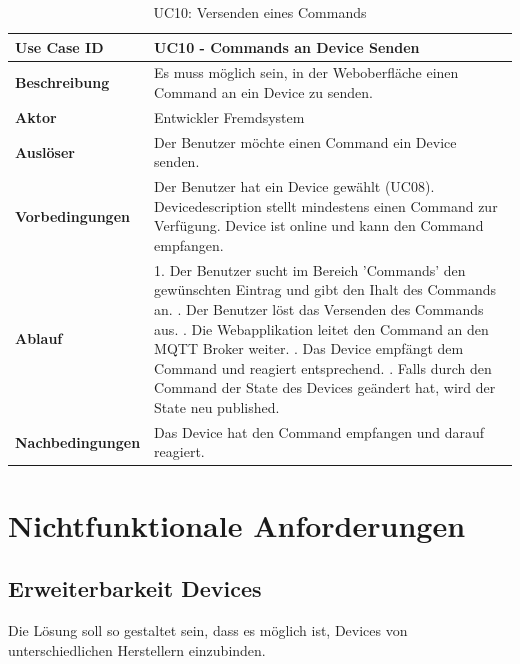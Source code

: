 \begin{table}[H]
\begin{tabularx}{\textwidth}{|l|X|}

 \hline
 {\bf Use Case ID }    & UC10 - Commands an Device Senden \\  \hline
 {\bf Beschreibung }   & Es muss möglich sein, in der Weboberfläche einen Command an ein Device zu senden. \\ \hline
 {\bf Aktor }          & Entwickler Fremdsystem \\ \hline
 {\bf Auslöser }       & Der Benutzer möchte einen Command ein Device senden. \\ \hline
 {\bf Vorbedingungen } & 
     Der Benutzer hat ein Device gewählt (UC08). \newline
     Devicedescription stellt mindestens einen Command zur Verfügung. \newline 
     Device ist online und kann den Command empfangen. \\ \hline
 {\bf Ablauf }         & 
     1. Der Benutzer sucht im Bereich 'Commands' den gewünschten Eintrag und gibt den Ihalt des Commands an. \newline
     2. Der Benutzer löst das Versenden des Commands aus. \newline
     3. Die Webapplikation leitet den Command an den MQTT Broker weiter. \newline
     4. Das Device empfängt dem Command und reagiert entsprechend. \newline
     5. Falls durch den Command der State des Devices geändert hat, wird der State neu published.
     \\ \hline
 {\bf Nachbedingungen} & Das Device hat den Command empfangen und darauf reagiert. \\ \hline
  
\end{tabularx}
\caption{UC10: Versenden eines Commands}
\end{table}




\section{Nichtfunktionale Anforderungen}

\subsection{Erweiterbarkeit Devices}
Die Lösung soll so gestaltet sein, dass es möglich ist, Devices von unterschiedlichen Herstellern einzubinden.

